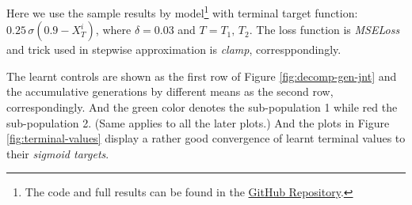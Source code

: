 \documentclass[a4paper,10pt]{article}
\newcommand{\1}{\mathbf{1}}
\begin{document}
Here we use the sample results by model\footnote{The code and full results can be found in the \href{https://github.com/OrangeAoo/PA-MFG-FBSDE/blob/FBSDE/2Period/Joint_Optim_2Prdx1/Adamax_clamp_sig_MSE.ipynb}{GitHub Repository}.} with terminal target function: $0.25\,\sigma{\left(0.9-X_T^i\right)}$, where $\delta=0.03$ and $T=T_1,\,T_2$. The loss function is \textit{MSELoss} and trick used in stepwise approximation is \textit{clamp}, corresppondingly. 

The learnt controls are shown as the first row of Figure \ref{fig:decomp-gen-jnt} and the accumulative generations by different means as the second row, correspondingly. And the green color denotes the sub-population 1 while red the sub-population 2. (Same applies to all the later plots.) 
And the plots in Figure \ref{fig:terminal-values} display a rather good convergence of learnt terminal values to their \textit{sigmoid targets}. 
\end{document}
